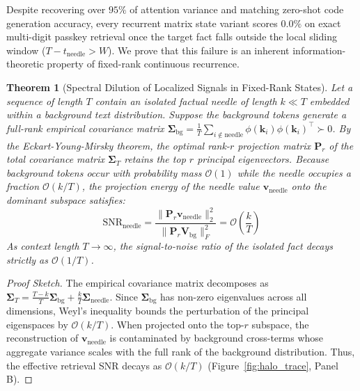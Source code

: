 \documentclass[11pt,a4paper]{article}
\newtheorem{theorem}{Theorem}
\begin{document}
Despite recovering over $95\%$ of attention variance and matching zero-shot code generation accuracy, every recurrent matrix state variant scores $0.0\%$ on exact multi-digit passkey retrieval once the target fact falls outside the local sliding window ($T - t_{\text{needle}} > W$). We prove that this failure is an inherent information-theoretic property of fixed-rank continuous recurrence.

\begin{theorem}[Spectral Dilution of Localized Signals in Fixed-Rank States]
\label{thm:spectral_dilution}
Let a sequence of length $T$ contain an isolated factual needle of length $k \ll T$ embedded within a background text distribution. Suppose the background tokens generate a full-rank empirical covariance matrix $\mathbf{\Sigma}_{\text{bg}} = \frac{1}{T}\sum_{i \notin \text{needle}} \phi(\mathbf{k}_i)\phi(\mathbf{k}_i)^\top \succ 0$. By the Eckart-Young-Mirsky theorem, the optimal rank-$r$ projection matrix $\mathbf{P}_r$ of the total covariance matrix $\mathbf{\Sigma}_T$ retains the top $r$ principal eigenvectors. Because background tokens occur with probability mass $\mathcal{O}(1)$ while the needle occupies a fraction $\mathcal{O}(k/T)$, the projection energy of the needle value $\mathbf{v}_{\text{needle}}$ onto the dominant subspace satisfies:
\begin{equation}
\text{SNR}_{\text{needle}} = \frac{\|\mathbf{P}_r \mathbf{v}_{\text{needle}}\|_2^2}{\|\mathbf{P}_r \mathbf{V}_{\text{bg}}\|_F^2} = \mathcal{O}\left(\frac{k}{T}\right)
\end{equation}
As context length $T \to \infty$, the signal-to-noise ratio of the isolated fact decays strictly as $\mathcal{O}(1/T)$.
\end{theorem}

\begin{proof}[Proof Sketch]
The empirical covariance matrix decomposes as $\mathbf{\Sigma}_T = \frac{T-k}{T} \mathbf{\Sigma}_{\text{bg}} + \frac{k}{T} \mathbf{\Sigma}_{\text{needle}}$. Since $\mathbf{\Sigma}_{\text{bg}}$ has non-zero eigenvalues across all dimensions, Weyl's inequality bounds the perturbation of the principal eigenspaces by $\mathcal{O}(k/T)$. When projected onto the top-$r$ subspace, the reconstruction of $\mathbf{v}_{\text{needle}}$ is contaminated by background cross-terms whose aggregate variance scales with the full rank of the background distribution. Thus, the effective retrieval SNR decays as $\mathcal{O}(k/T)$ (Figure~\ref{fig:halo_trace}, Panel B).
\end{proof}
\end{document}
